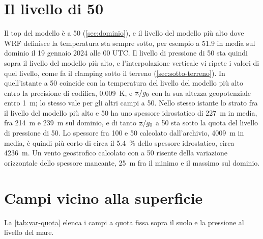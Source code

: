 \section{Il livello di \SI{50}{\hPa}}
\label{sec:livello-50}

Il top del modello è a \SI{50}{\hPa} (\cref{sec:dominio}), e il livello del modello più alto dove
WRF definisce la temperatura sta sempre sotto, per esempio a \SI{51.9}{\hPa} in media sul dominio il
19 gennaio 2024 alle 00 UTC. Il livello di pressione di \SI{50}{\hPa} sta quindi sopra il livello
del modello più alto, e l'interpolazione
verticale vi ripete i valori di quel livello, come fa il clamping sotto il terreno
(\cref{sec:sotto-terreno}). In quell'istante  a \SI{50}{\hPa} coincide con la temperatura
del livello del modello più alto entro la precisione di codifica, \SI{0.009}{K}, e $\campo{z}/g_0$
con la sua altezza geopotenziale entro \SI{1}{m}; lo stesso vale per gli altri campi a
\SI{50}{\hPa}. Nello stesso istante lo strato fra il livello del modello più alto e
\SI{50}{\hPa} ha uno spessore idrostatico di \SI{227}{m} in media, fra \SI{214}{m} e \SI{239}{m} sul dominio, e di tanto
$\campo{z}/g_0$ a \SI{50}{\hPa} sta sotto la quota del livello di pressione di \SI{50}{\hPa}. Lo
spessore fra \SI{100}{\hPa} e \SI{50}{\hPa} calcolato dall'archivio, \SI{4009}{m} in media, è quindi
più corto di circa il \SI{5.4}{\percent} dello spessore idrostatico, circa \SI{4236}{m}. Un vento
geostrofico calcolato con  a \SI{50}{\hPa} risente della variazione orizzontale dello
spessore mancante, \SI{25}{m} fra il minimo e il massimo sul dominio.

\section{Campi vicino alla superficie}
\label{sec:vicino-superficie}

La \cref{tab:var-quota} elenca i campi a quota fissa sopra il suolo e la pressione al livello del
mare.

